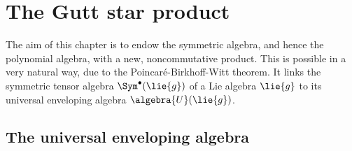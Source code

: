 \section{The Gutt star product}
\label{sec:chap3_GuttStar}

The aim of this chapter is to endow the symmetric algebra, and hence the 
polynomial algebra, with a new, noncommutative product. This is possible in 
a very natural way, due to the Poincar\'e-Birkhoff-Witt theorem. It links 
the symmetric tensor algebra $\Sym^{\bullet}(\lie{g})$ of a Lie algebra 
$\lie{g}$ to its universal enveloping algebra $\algebra{U}(\lie{g})$.


\subsection{The universal enveloping algebra}
\label{subsec:chap3_UniversalEnvelopingAlgebra}

